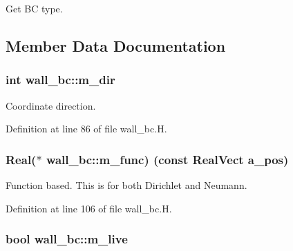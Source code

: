 Get BC type. 



\subsection{Member Data Documentation}
\subsubsection[{\texorpdfstring{m\+\_\+dir}{m_dir}}]{\setlength{\rightskip}{0pt plus 5cm}int wall\+\_\+bc\+::m\+\_\+dir\hspace{0.3cm}{\ttfamily [protected]}}\hypertarget{classwall__bc_a6bb629a9b240f4c7d1fb8349ca8558c3}{}\label{classwall__bc_a6bb629a9b240f4c7d1fb8349ca8558c3}


Coordinate direction. 



Definition at line 86 of file wall\+\_\+bc.\+H.

\subsubsection[{\texorpdfstring{m\+\_\+func}{m_func}}]{\setlength{\rightskip}{0pt plus 5cm}Real($\ast$ wall\+\_\+bc\+::m\+\_\+func) (const Real\+Vect a\+\_\+pos)\hspace{0.3cm}{\ttfamily [protected]}}\hypertarget{classwall__bc_a16c88bd2a7d2ca3a4e78c465466991c9}{}\label{classwall__bc_a16c88bd2a7d2ca3a4e78c465466991c9}


Function based. This is for both Dirichlet and Neumann. 



Definition at line 106 of file wall\+\_\+bc.\+H.

\subsubsection[{\texorpdfstring{m\+\_\+live}{m_live}}]{\setlength{\rightskip}{0pt plus 5cm}bool wall\+\_\+bc\+::m\+\_\+live\hspace{0.3cm}{\ttfamily [protected]}}\hypertarget{classwall__bc_a5d870d14553da786d941c904a2a07d60}{}\label{classwall__bc_a5d870d14553da786d941c904a2a07d60}


